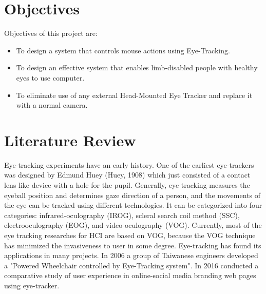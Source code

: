 \documentclass[12pt,singleside,a4paper]{article}
\begin{document}
\section*{Objectives}
Objectives of this project are:
\newline
\begin{itemize}

\item To design a system that controls mouse actions using Eye-Tracking.

\item To design an effective system that enables limb-disabled people with healthy eyes to use computer.

\item To eliminate use of any external Head-Mounted Eye Tracker and replace it with a normal camera. 

\end{itemize}
\newpage
\section*{Literature Review}
Eye-tracking experiments have an early history. One of the earliest eye-trackers was designed by Edmund Huey (Huey, 1908) which just consisted of a contact lens like device with a hole for the pupil.\vspace{2mm}\newline
Generally, eye tracking measures the eyeball position and determines gaze direction of a person, and the movements of the eye can be tracked using different technologies. It can be categorized into four categories: infrared-oculography (IROG), scleral search coil method (SSC), electrooculography (EOG), and video-oculography (VOG). Currently, most of the eye tracking researches for HCI are based on VOG, because the VOG technique has minimized the invasiveness to user in some degree.\vspace{2mm}\newline
Eye-tracking has found its applications in many projects. In 2006 a group of Taiwanese engineers developed a "Powered Wheelchair controlled by Eye-Tracking system". In 2016 conducted a comparative study of user experience in online-social media branding web pages using eye-tracker.
\end{document}
